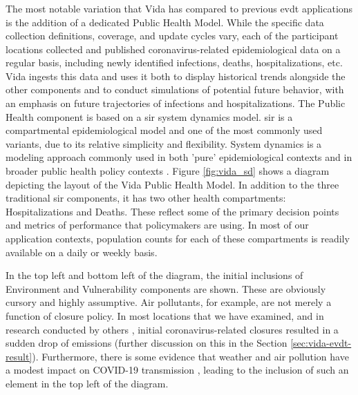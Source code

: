 \subsubsection{}

The most notable variation that Vida has compared to previous \ac{evdt} applications is the addition of a dedicated Public Health Model. While the specific data collection definitions, coverage, and update cycles vary, each of the participant locations collected and published coronavirus-related epidemiological data on a regular basis, including newly identified infections, deaths, hospitalizations, etc. Vida ingests this data and uses it both to display historical trends alongside the other components and to conduct simulations of potential future behavior, with an emphasis on future trajectories of infections and hospitalizations. The Public Health component is based on a \ac{sir} system dynamics model. \ac{sir} is a compartmental epidemiological model and one of the most commonly used variants, due to its relative simplicity and flexibility. System dynamics is a modeling approach commonly used in both 'pure' epidemiological contexts \cite{homerSystemDynamicsModeling2006} and in broader public health policy contexts \cite{deutschCommunitybasedSystemDynamics2020}. Figure \ref{fig:vida_sd} shows a diagram depicting the layout of the Vida Public Health Model. In addition to the three traditional \ac{sir} components, it has two other health compartments: Hospitalizations and Deaths. These reflect some of the primary decision points and metrics of performance that policymakers are using. In most of our application contexts, population counts for each of these compartments is readily available on a daily or weekly basis. 

In the top left and bottom left of the diagram, the initial inclusions of Environment and Vulnerability components are shown. These are obviously cursory and highly assumptive. Air pollutants, for example, are not merely a function of closure policy. In most locations that we have examined, and in research conducted by others \cite{isaifanDramaticImpactCoronavirus2020}, initial coronavirus-related closures resulted in a sudden drop of emissions (further discussion on this in the Section \ref{sec:vida-evdt-result}). Furthermore, there is some evidence that weather and air pollution have a modest impact on COVID-19 transmission \cite{xuModestImpactWeather2020}, leading to the inclusion of such an element in the top left of the diagram.


